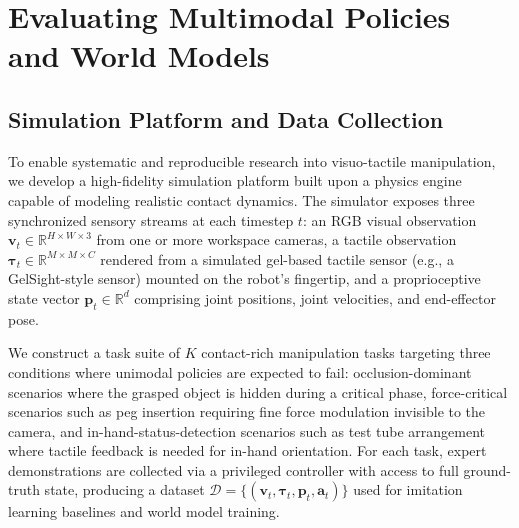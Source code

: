 \documentclass{article}
\begin{document}

\section{Evaluating Multimodal Policies and World Models}

\subsection{Simulation Platform and Data Collection}
To enable systematic and reproducible research into visuo-tactile manipulation, we develop a high-fidelity simulation platform built upon a physics engine capable of modeling realistic contact dynamics. The simulator exposes three synchronized sensory streams at each timestep $t$: an RGB visual observation $\mathbf{v}_t \in \mathbb{R}^{H \times W \times 3}$ from one or more workspace cameras, a tactile observation $\boldsymbol{\tau}_t \in \mathbb{R}^{M \times M \times C}$ rendered from a simulated gel-based tactile sensor (e.g., a GelSight-style sensor) mounted on the robot's fingertip, and a proprioceptive state vector $\mathbf{p}_t \in \mathbb{R}^{d}$ comprising joint positions, joint velocities, and end-effector pose.

We construct a task suite of $K$ contact-rich manipulation tasks targeting three conditions where unimodal policies are expected to fail: occlusion-dominant scenarios where the grasped object is hidden during a critical phase, force-critical scenarios such as peg insertion requiring fine force modulation invisible to the camera, and in-hand-status-detection scenarios such as test tube arrangement where tactile feedback is needed for in-hand orientation. For each task, expert demonstrations are collected via a privileged controller with access to full ground-truth state, producing a dataset $\mathcal{D} = \{(\mathbf{v}_t, \boldsymbol{\tau}_t, \mathbf{p}_t, \mathbf{a}_t)\}$ used for imitation learning baselines and world model training.
\end{document}
